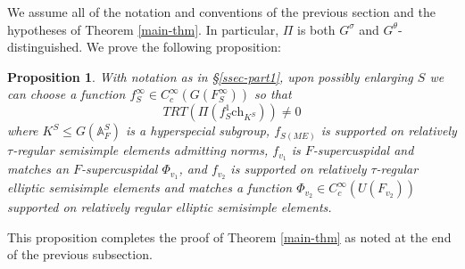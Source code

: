 \documentclass[12pt]{amsart}
\newtheorem{prop}[thm]{Proposition}
\theoremstyle{remark}
\numberwithin{equation}{section}
\newcommand{\A}{\mathbb{A}}
\theoremstyle{definition}
\numberwithin{equation}{subsection}
\begin{document}
We assume all of the notation and conventions of the previous section and the hypotheses of Theorem \ref{main-thm}.  In particular, $\Pi$ is both $G^{\sigma}$ and $G^{\theta}$-distinguished.  We prove the following proposition:
\begin{prop} With notation as in \S \ref{ssec-part1}, upon possibly enlarging $S$ we can choose a function $f_S^{\infty} \in C_c^{\infty}(G(F_{S}^{\infty}))$ so that
$$
TRT(\Pi(f_S^1\mathrm{ch}_{K^S})) \neq 0
$$
where $K^S \leq G(\A_F^S)$ is a hyperspecial subgroup, $f_{S(ME)}$ is supported on relatively $\tau$-regular semisimple elements admitting norms, $f_{v_1}$ is $F$-supercuspidal and matches an $F$-supercuspidal $\Phi_{v_1}$, and  $f_{v_2}$  is supported on
relatively $\tau$-regular elliptic semisimple elements and matches a function $\Phi_{v_2} \in C_c^{\infty}(U(F_{v_2}))$ supported on relatively regular elliptic semisimple elements.
\end{prop}

\noindent This proposition completes the proof of Theorem \ref{main-thm} as noted at the end of the previous subsection.
\end{document}
